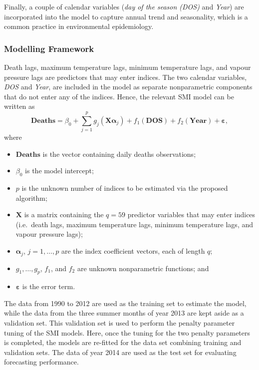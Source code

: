 \documentclass[
  11pt,
  a4paper,
]{article}
\providecommand{\tightlist}{%
  \setlength{\itemsep}{0pt}\setlength{\parskip}{0pt}}\usepackage{longtable,booktabs,array}
\begin{document}
Finally, a couple of calendar variables (\emph{day of the season (DOS)}
and \emph{Year}) are incorporated into the model to capture annual trend
and seasonality, which is a common practice in environmental
epidemiology.

\subsubsection{Modelling Framework}\label{modelling-framework}

Death lags, maximum temperature lags, minimum temperature lags, and
vapour pressure lags are predictors that may enter indices. The two
calendar variables, \emph{DOS} and \emph{Year}, are included in the
model as separate nonparametric components that do not enter any of the
indices. Hence, the relevant SMI model can be written as \[
  \textbf{Deaths} = \beta_{0} + \sum_{j = 1}^{p}{g_{j}(\bm{X}\bm{\alpha}_{j})} + f_{1}(\textbf{DOS}) + f_{2}(\textbf{Year})+ \bm{\varepsilon},
\] where

\begin{itemize}
\tightlist
\item
  \(\textbf{Deaths}\) is the vector containing daily deaths
  observations;
\item
  \(\beta_{0}\) is the model intercept;
\item
  \(p\) is the unknown number of indices to be estimated via the
  proposed algorithm;
\item
  \(\bm{X}\) is a matrix containing the \(q=59\) predictor variables
  that may enter indices (i.e.~death lags, maximum temperature lags,
  minimum temperature lags, and vapour pressure lags);
\item
  \(\bm{\alpha}_{j}\), \(j = 1, \dots, p\) are the index coefficient
  vectors, each of length \(q\);
\item
  \(g_{1}, \dots,g_p\), \(f_{1}\), and \(f_{2}\) are unknown
  nonparametric functions; and
\item
  \(\bm{\varepsilon}\) is the error term.
\end{itemize}

The data from 1990 to 2012 are used as the training set to estimate the
model, while the data from the three summer months of year 2013 are kept
aside as a validation set. This validation set is used to perform the
penalty parameter tuning of the SMI models. Here, once the tuning for
the two penalty parameters is completed, the models are re-fitted for
the data set combining training and validation sets. The data of year
2014 are used as the test set for evaluating forecasting performance.
\end{document}
